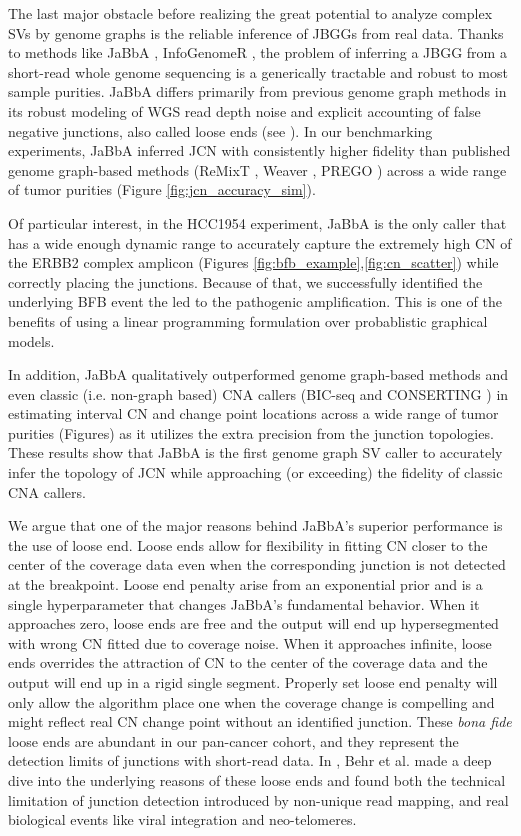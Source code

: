 \documentclass[phd,tocprelim]{cornell}
\begin{document}
The last major obstacle before realizing the great potential to analyze complex SVs by genome graphs is the reliable inference of JBGGs from real data. Thanks to methods like JaBbA \cite{Hadi2020-um}, InfoGenomeR \cite{Lee2021-rl}, the problem of inferring a JBGG from a short-read whole genome sequencing is a generically tractable and robust to most sample purities. JaBbA differs primarily from previous genome graph methods in its robust modeling of WGS read depth noise and explicit accounting of false negative junctions, also called loose ends (see ). In our benchmarking experiments, JaBbA inferred JCN with consistently higher fidelity than published genome graph-based methods (ReMixT \cite{McPherson2017-ry}, Weaver \cite{Li2016-qa}, PREGO \cite{Oesper2012-vw}) across a wide range of tumor purities (Figure \ref{fig:jcn_accuracy_sim}).

Of particular interest, in the HCC1954 experiment, JaBbA is the only caller that has a wide enough dynamic range to accurately capture the extremely high CN of the ERBB2 complex amplicon (Figures \ref{fig:bfb_example},\ref{fig:cn_scatter}) while correctly placing the junctions. Because of that, we successfully identified the underlying BFB event the led to the pathogenic amplification. This is one of the benefits of using a linear programming formulation over probablistic graphical models.

In addition, JaBbA qualitatively outperformed genome graph-based methods and even classic (i.e. non-graph based) CNA callers (BIC-seq \cite{Xi2011-oa} and CONSERTING \cite{Chen2015-sw}) in estimating interval CN and change point locations across a wide range of tumor purities (Figures) as it utilizes the extra precision from the junction topologies. These results show that JaBbA is the first genome graph SV caller to accurately infer the topology of JCN while approaching (or exceeding) the fidelity of classic CNA callers.

We argue that one of the major reasons behind JaBbA's superior performance is the use of loose end. Loose ends allow for flexibility in fitting CN closer to the center of the coverage data even when the corresponding junction is not detected at the breakpoint. Loose end penalty \textlambda arise from an exponential prior and is a single hyperparameter that changes JaBbA's fundamental behavior. When it approaches zero, loose ends are free and the output will end up hypersegmented with wrong CN fitted due to coverage noise. When it approaches infinite, loose ends overrides the attraction of CN to the center of the coverage data and the output will end up in a rigid single segment. Properly set loose end penalty will only allow the algorithm place one when the coverage change is compelling and might reflect real CN change point without an identified junction. These \textit{bona fide} loose ends are abundant in our pan-cancer cohort, and they represent the detection limits of junctions with short-read data. In \cite{Behr2021-gf}, Behr et al. made a deep dive into the underlying reasons of these loose ends and found both the technical limitation of junction detection introduced by non-unique read mapping, and real biological events like viral integration and neo-telomeres.
\end{document}
